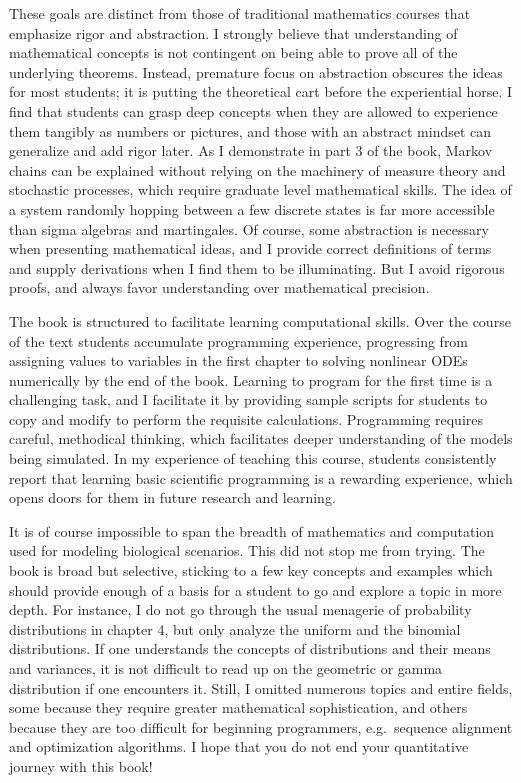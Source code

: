 \documentclass[
]{book}
\begin{document}
These goals are distinct from those of traditional mathematics courses that emphasize rigor and abstraction. I strongly believe that understanding of mathematical concepts is not contingent on being able to prove all of the underlying theorems. Instead, premature focus on abstraction obscures the ideas for most students; it is putting the theoretical cart before the experiential horse. I find that students can grasp deep concepts when they are allowed to experience them tangibly as numbers or pictures, and those with an abstract mindset can generalize and add rigor later. As I demonstrate in part 3 of the book, Markov chains can be explained without relying on the machinery of measure theory and stochastic processes, which require graduate level mathematical skills. The idea of a system randomly hopping between a few discrete states is far more accessible than sigma algebras and martingales. Of course, some abstraction is necessary when presenting mathematical ideas, and I provide correct definitions of terms and supply derivations when I find them to be illuminating. But I avoid rigorous proofs, and always favor understanding over mathematical precision.

The book is structured to facilitate learning computational skills. Over the course of the text students accumulate programming experience, progressing from assigning values to variables in the first chapter to solving nonlinear ODEs numerically by the end of the book. Learning to program for the first time is a challenging task, and I facilitate it by providing sample scripts for students to copy and modify to perform the requisite calculations. Programming requires careful, methodical thinking, which facilitates deeper understanding of the models being simulated. In my experience of teaching this course, students consistently report that learning basic scientific programming is a rewarding experience, which opens doors for them in future research and learning.

It is of course impossible to span the breadth of mathematics and computation used for modeling biological scenarios. This did not stop me from trying. The book is broad but selective, sticking to a few key concepts and examples which should provide enough of a basis for a student to go and explore a topic in more depth. For instance, I do not go through the usual menagerie of probability distributions in chapter 4, but only analyze the uniform and the binomial distributions. If one understands the concepts of distributions and their means and variances, it is not difficult to read up on the geometric or gamma distribution if one encounters it. Still, I omitted numerous topics and entire fields, some because they require greater mathematical sophistication, and others because they are too difficult for beginning programmers, e.g.~sequence alignment and optimization algorithms. I hope that you do not end your quantitative journey with this book!
\end{document}
